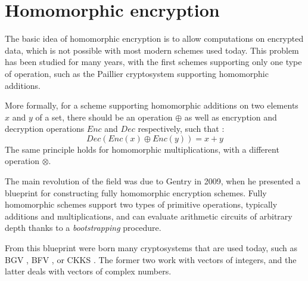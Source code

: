 \documentclass[a4paper,11pt,oneside]{report}
\begin{document}
\section{Homomorphic encryption}

The basic idea of homomorphic encryption is to allow computations on encrypted data, which is not possible with most modern schemes used today. 
This problem has been studied for many years, with the first schemes supporting only one type of operation, such as the Paillier \cite{paillier_public-key_1999} cryptosystem supporting homomorphic additions. 

More formally, for a scheme supporting homomorphic additions on two elements $x$ and $y$ of a set, there should be an operation $\oplus$ as well as encryption and decryption operations $Enc$ and $Dec$ respectively, such that : 
\begin{equation}\label{eq:homomorphic_add}
  Dec(Enc(x) \oplus Enc(y)) = x + y
\end{equation}
The same principle holds for homomorphic multiplications, with a different operation $\otimes$.

The main revolution of the field was due to Gentry \cite{gentry_fully_2009} in 2009, when he presented a blueprint for constructing fully homomorphic encryption schemes. 
Fully homomorphic schemes support two types of primitive operations, typically additions and multiplications, and can evaluate arithmetic circuits of arbitrary depth thanks to a \emph{bootstrapping} procedure.

From this blueprint were born many cryptosystems that are used today, such as BGV \cite{brakerski_leveled_2012}, BFV \cite{fan_somewhat_2012}, or CKKS \cite{cheon_homomorphic_2017, cheon_full_2019}. 
The former two work with vectors of integers, and the latter deals with vectors of complex numbers.
\end{document}
